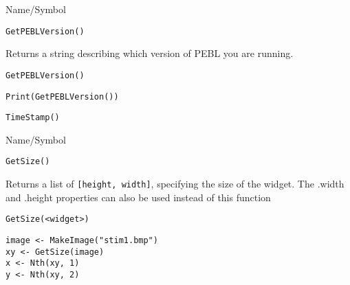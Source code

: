 \rl




\begin{desc}{Name/Symbol}
\item[Name/Symbol]	\verb+GetPEBLVersion()+

\item[Description]	Returns a string describing which version of PEBL you are running.

\item[Usage]
\begin{verbatim}
GetPEBLVersion() 
\end{verbatim}

\item[Example]
\begin{verbatim}
Print(GetPEBLVersion())
\end{verbatim}

\item[See Also]	\verb+TimeStamp()+
\end{desc}

\rl



\begin{desc}{Name/Symbol}
\item[Name/Symbol]	\verb+GetSize()+

\item[Description] Returns a list of \verb+[height, width]+,
  specifying the size of the widget.
  The .width and .height properties can also be used instead of this function

\item[Usage]
\begin{verbatim}
GetSize(<widget>)
\end{verbatim}

\item[Example]
\begin{verbatim}
image <- MakeImage("stim1.bmp")
xy <- GetSize(image)
x <- Nth(xy, 1)
y <- Nth(xy, 2)
\end{verbatim}

\item[See Also]	
\end{desc}

\rl


